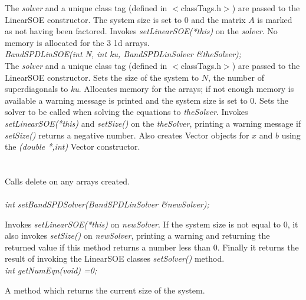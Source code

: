 The {\em solver} and a unique class tag (defined in $<$classTags.h$>$)
are passed to the LinearSOE constructor. The system size is set
to $0$ and the matrix $A$ is marked as not having been factored. Invokes
{\em setLinearSOE(*this)} on the {\em solver}. No memory is
allocated for the 3 1d arrays. \\  

{\em BandSPDLinSOE(int N, int ku, BandSPDLinSolver \&theSolver);}\\
The {\em solver} and a unique class tag (defined in $<$classTags.h$>$)
are passed to the LinearSOE constructor. 
Sets the size of the system to $N$, the number of superdiagonals to 
{\em ku}. Allocates memory for the arrays; if not enough
memory is available a warning message is printed and the system size
is set to $0$. Sets the solver to be called when solving the
equations to {\em theSolver}. Invokes {\em setLinearSOE(*this)} and
{\em setSize()} on the {\em theSolver}, printing a warning message if
{\em setSize()} returns a negative number. Also creates Vector objects
for $x$ and $b$ using the {\em (double *,int)} Vector constructor. \\


 \\
\\ 
Calls delete on any arrays created. \\

  \\
{\em  int setBandSPDSolver(BandSPDLinSolver \&newSolver);}

Invokes {\em setLinearSOE(*this)} on {\em newSolver}.
If the system size is not equal to $0$, it also invokes {\em setSize()}
on {\em newSolver}, printing a warning and returning the returned value if this
method returns a number less than $0$. Finally it returns the result
of invoking the LinearSOE classes {\em setSolver()} method. \\

{\em int getNumEqn(void) =0; } 

A method which returns the current size of the system. \\

